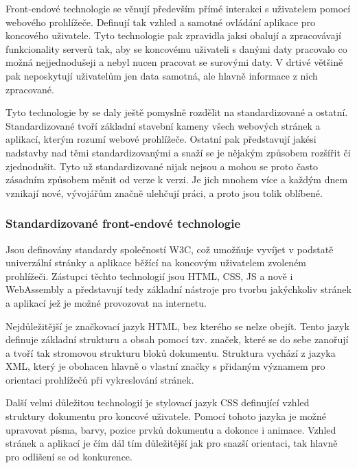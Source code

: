 	Front-endové technologie se věnují především přímé interakci s uživatelem pomocí webového prohlížeče.
	Definují tak vzhled a samotné ovládání aplikace pro koncového uživatele.
	Tyto technologie pak zpravidla jaksi obalují a zpracovávají funkcionality serverů tak, aby se koncovému uživateli s danými
	daty pracovalo co možná nejjednodušeji a nebyl nucen pracovat se surovými daty.
	V drtivé většině pak neposkytují uživatelům jen data samotná, ale hlavně informace z nich zpracované.

	Tyto technologie by se daly ještě pomyslně rozdělit na standardizované a ostatní.
	Standardizované tvoří základní stavební kameny všech webových stránek a aplikací, kterým rozumí webové
	prohlížeče.
	Ostatní pak představují jakési nadstavby nad těmi standardizovanými a snaží se je nějakým způsobem rozšířit
	či zjednodušit.
	Tyto už standardizované nijak nejsou a mohou se proto často zásadním způsobem měnit od verze k verzi.
	Je jich mnohem více a každým dnem vznikají nové, vývojářům značně ulehčují práci, a proto jsou tolik oblíbené.

		\subsubsection{Standardizované front-endové technologie}

		Jsou definovány standardy společností W3C, což umožňuje vyvíjet v podstatě univerzální stránky a aplikace běžící na
		koncovým uživatelem zvoleném prohlížeči.
		Zástupci těchto technologií jsou HTML, CSS, \ac{JS} a nově i WebAssembly a představují tedy základní
		nástroje pro tvorbu jakýchkoliv stránek a aplikací jež je možné provozovat na internetu. \cite{w3c_webdesign}

		Nejdůležitější je značkovací jazyk \noindent\Ac{HTML}, bez kterého se nelze obejít.
		Tento jazyk definuje základní strukturu a obsah pomocí tzv. značek, které se do sebe zanořují a
		tvoří tak stromovou strukturu bloků dokumentu.
		Struktura vychází z jazyka \noindent\Ac{XML}, který je obohacen hlavně
		o vlastní značky s přidaným významem pro orientaci prohlížečů při vykreslování stránek. \cite{html_hypertext_markup_language}

		Další velmi důležitou technologií je stylovací jazyk \noindent\Ac{CSS} definující vzhled struktury
		dokumentu pro koncové uživatele.
		Pomocí tohoto jazyka je možné upravovat písma, barvy, pozice prvků dokumentu a dokonce i animace.
		Vzhled stránek a aplikací je čím dál tím důležitější jak pro snazší orientaci, tak hlavně pro odlišení se od konkurence.
		\cite{css_cascading_style_sheets}

